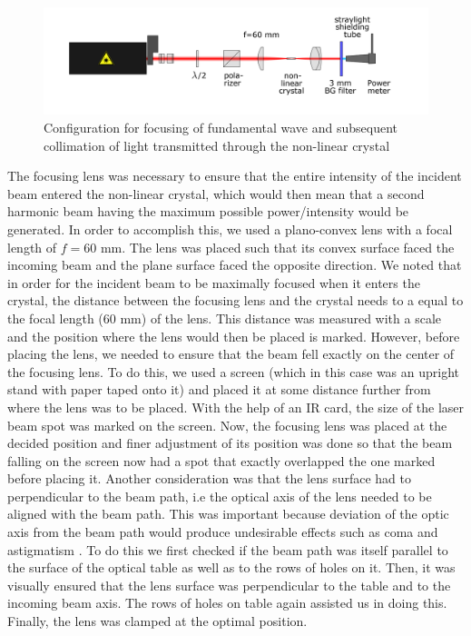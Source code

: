 \begin{figure}[H]
\includegraphics[scale=0.4]{./imagesandplots/pic3.png}
\centering
\caption{Configuration for focusing of fundamental wave and subsequent collimation of light transmitted through the non-linear crystal \cite{UB}}
\label{figexpt6}
\end{figure}

The focusing lens was necessary to ensure that the entire intensity of the incident beam entered the non-linear crystal, which would then mean that a second harmonic beam having the maximum possible power/intensity would be generated. In order to accomplish this, we used a plano-convex lens with a focal length of $f=$60 mm. The lens was placed such that its convex surface faced the incoming beam and the plane surface faced the opposite direction. We noted that in order for the incident beam to be maximally focused when it enters the crystal, the distance between the focusing lens and the crystal needs to a  equal to the focal length (60 mm) of the lens. This distance was measured with a scale and the position where the lens would then be placed is marked. However, before placing the lens, we needed to ensure that the beam fell exactly on the center of the focusing lens. To do this, we used a screen (which in this case was an upright stand with paper taped onto it) and placed it at some distance further from where the lens was to be placed. With the help of an IR card, the size of the laser beam spot was marked on the screen. Now, the focusing lens was placed at the decided position and finer adjustment of its position was done so that the beam falling on the screen now had a spot that exactly overlapped the one marked before placing it. Another consideration was that the lens surface had to perpendicular to the beam path, i.e the optical axis of the lens needed to be aligned with the beam path. This was important because deviation of the optic axis from the beam path would produce undesirable effects such as coma and astigmatism \cite{UB}. To do this we first checked if the beam path was itself parallel to the surface of the optical table as well as to the rows of holes on it. Then, it was visually ensured that the lens surface was perpendicular to the table and to the incoming beam axis. The rows of holes on table again assisted us in doing this. Finally, the lens was clamped at the optimal position.   

